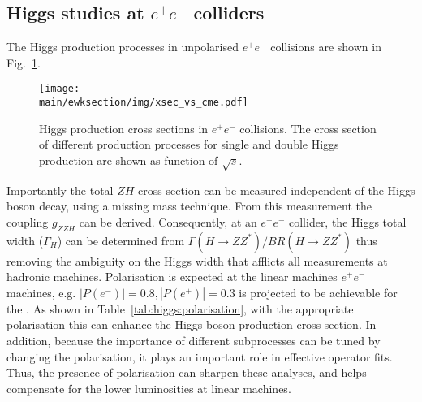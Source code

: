 \documentclass[../report.tex]{subfiles}
\providecommand{\main}{..}
\begin{document}
\subsection{Higgs studies at $e^+ e^-$ colliders}
The Higgs production processes in unpolarised $e^+e^-$ collisions are shown in Fig.~\ref{fig:xsec_vs_cme}.
\begin{figure}[!ht]
\centering
\texttt{[image: \\main/ewksection/img/xsec\_vs\_cme.pdf]}
\caption{\label{fig:xsec_vs_cme}
Higgs production cross sections in $e^+e^-$ collisions\cite{Abramowicz:2016zbo}. The cross section of different production processes for single and double Higgs production are shown as function of $\sqrt{s}$.}
\end{figure}
Importantly the total $ZH$ cross section can be measured  independent of the Higgs boson decay, using a missing mass technique. From this measurement the coupling $g_{ZZH}$ can be derived. Consequently, at an $e^+ e^-$ collider, the Higgs total width ($\Gamma_H$) can be determined
from $\Gamma(H\to ZZ^*)/BR(H \to ZZ^*)$	thus removing the ambiguity on the Higgs width that afflicts all measurements at hadronic machines.
Polarisation is expected at the linear machines $e^+e^-$ machines, e.g.
$|P(e^{-})|=0.8,|P(e^{+})|=0.3$ is projected to be achievable for the \ILC.
As shown in Table~\ref{tab:higgs:polarisation}, with the appropriate polarisation this can enhance the Higgs boson production cross section.
In addition, because the importance of different subprocesses can be tuned by changing the polarisation, it plays an important role in effective operator fits.
Thus, the presence of polarisation can sharpen these analyses, and helps compensate for the lower luminosities at linear machines.
\end{document}
